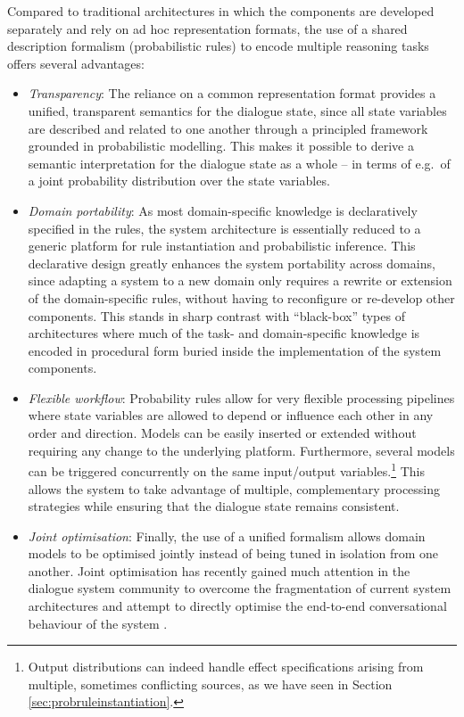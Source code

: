 Compared to traditional architectures in which the components are developed separately and rely on ad hoc representation formats, the use of a shared description formalism (probabilistic rules) to encode multiple reasoning tasks offers several advantages:
\begin{itemize}
\item \textit{Transparency}:  The reliance on a common representation format provides a unified, transparent semantics for the dialogue state, since all state variables are described and related to one another through a principled framework grounded in probabilistic modelling.  This makes it possible to derive a semantic interpretation for the dialogue state as a whole -- in terms of e.g.\ of a joint probability distribution over the state variables. 

\item \textit{Domain portability}:   As most domain-specific knowledge is declaratively specified in the rules, the system architecture is essentially reduced to a generic platform for rule instantiation and probabilistic inference.  This declarative design greatly enhances the system portability across domains, since adapting a system to a new domain only requires a rewrite or extension of the domain-specific rules, without having to reconfigure or re-develop other components.  This stands in sharp contrast with ``black-box'' types of architectures where much of the task- and domain-specific knowledge is encoded in procedural form buried inside the implementation of the system components.

\item \textit{Flexible workflow}:  Probability rules allow for very flexible processing pipelines where state variables are allowed to depend or influence each other in any order and direction.  Models can be easily inserted or extended without requiring any change to the underlying platform. Furthermore, several models can be triggered concurrently on the same input/output variables.\footnote{Output distributions can indeed handle effect specifications arising from multiple, sometimes conflicting sources, as we have seen in Section \ref{sec:probruleinstantiation}.} This allows the system to take advantage of multiple, complementary processing strategies while ensuring that the dialogue state remains consistent. 

\item \textit{Joint optimisation}:  Finally, the use of a unified formalism allows domain models to be optimised jointly instead of being tuned in isolation from one another. Joint optimisation has recently gained much attention in the dialogue system community to overcome the fragmentation of current system architectures and attempt to directly optimise the end-to-end conversational behaviour of the system \citep[see also][]{Lemon:2011}. 

\end{itemize}

